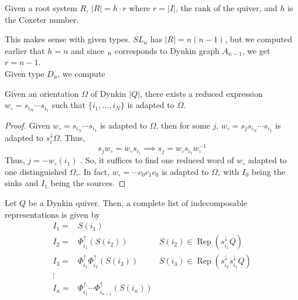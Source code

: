 \documentclass[11pt,leqno,oneside]{amsbook}
\numberwithin{thm}{section}
\newcommand{\Rep}{\operatorname{Rep}} %
\renewcommand{\Q}{Q} %
\newcommand{\sinktosource}{s^\downarrow} %
\newcommand{\sourcetosinkfunc}{\Phi^\uparrow} %
\begin{document}
\begin{cor}
  Given a root system \(R\), \(|R| = h \cdot r\) where \(r = |I|\),
  the rank of the quiver, and \(h\) is the Coxeter number.
\end{cor}
\begin{example}
  This makes sense with given types. \(SL_n\) has \(|R| = n(n-1)\),
  but we computed earlier that \(h = n\) and since \(\sl_n\)
  corresponds to Dynkin graph \(A_{n-1}\), we get \(r = n-1\). \\

  Given type \(D_n\), we compute 
\end{example}
\begin{prop}\label{dynkin-quivers-have-adapted-reduced-expressions}
  Given an orientation \(\Omega\) of Dynkin \(|\Q|\), there exists a
  reduced expression \(w_\circ = s_{i_N} \cdots s_{i_1}\) such that
  \(\{i_1, \ldots, i_N\}\) is adapted to \(\Omega\). 
\end{prop}
\begin{proof}
  Given \(w_\circ = s_{i_N} \cdots s_{i_1}\) is adapted to \(\Omega\),
  then for some \(j\), \(w_\circ = s_j s_{i_N} \cdots s_{i_1}\) is
  adapted to \(\sinktosource_i \Omega\). Thus, \[
    s_j w_\circ = w_\circ s_{i_1} \implies s_j = w_\circ s_{i_1} w_\circ^{-1}
  \]
  Thus, \(j = -w_\circ(i_1)\) . So, it
  suffices to find one reduced word of \(w_\circ\) adapted to one
  distinguished \(\Omega_\circ\). In fact, \(w_\circ = \cdots c_0 c_1
  c_0\) is adapted to \(\Omega_\circ\) with \(I_0\) being the sinks
  and \(I_1\) being the sources. 
\end{proof}
\begin{cor}
  Let \(\Q\) be a Dynkin quiver. Then, a complete list of indecomposable
  representations is given by
  \begin{align*}
    I_1 = & S(i_1) & \\
    I_2 = & \sourcetosinkfunc_{i_1}(S(i_2))
                   & S(i_2) \in \Rep(\sinktosource_{i_1}\Q) \\
    I_3 =
          &  \sourcetosinkfunc_{i_1} \sourcetosinkfunc_{i_2}(S(i_3))
          & S(i_3) \in \Rep(\sinktosource_{i_2} \sinktosource_{i_1} \Q)  \\
    \vdots & & \\
    I_n = & \sourcetosinkfunc_{i_1} \cdots \sourcetosinkfunc_{i_{n-1}}(S(i_{n}))
  \end{align*}
\end{cor}
\end{document}
